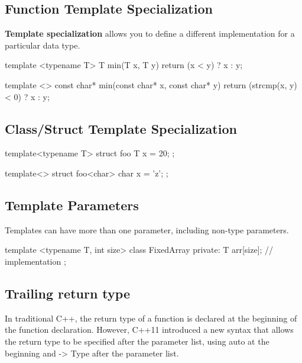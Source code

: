 \documentclass{report}
\begin{document}
    \pagebreak 
    \subsection{Function Template Specialization}
    \bigbreak \noindent 
    \begin{concept}
        \textbf{Template specialization} allows you to define a different implementation for a particular data type.
    \end{concept}
    \bigbreak \noindent 
    \begin{cppcode}
    template <typename T>
    T min(T x, T y) {
        return (x < y) ? x : y;
    }

    template <>
    const char* min(const char* x, const char* y) {
        return (strcmp(x, y) < 0) ? x : y;
    }
    \end{cppcode}

    \bigbreak \noindent 
    \subsection{Class/Struct Template Specialization}
    \bigbreak \noindent 
    \begin{cppcode}
    template<typename T>
    struct foo {
        T x = 20;
    };

    template<>
    struct foo<char> {
        char x = 'z';
    };
    \end{cppcode}

    \bigbreak \noindent 
    \subsection{Template Parameters}
    \bigbreak \noindent 
    \begin{concept}
        Templates can have more than one parameter, including non-type parameters.
    \end{concept}
    \bigbreak \noindent 
    \begin{cppcode}
        template <typename T, int size>
        class FixedArray {
            private:
            T arr[size];
            // implementation
        };
    \end{cppcode}

     \bigbreak \noindent 
    \subsection{Trailing return type}
    \bigbreak \noindent 
    In traditional C++, the return type of a function is declared at the beginning of the function declaration. However, C++11 introduced a new syntax that allows the return type to be specified after the parameter list, using auto at the beginning and -> Type after the parameter list.
    \bigbreak \noindent 
\end{document}
